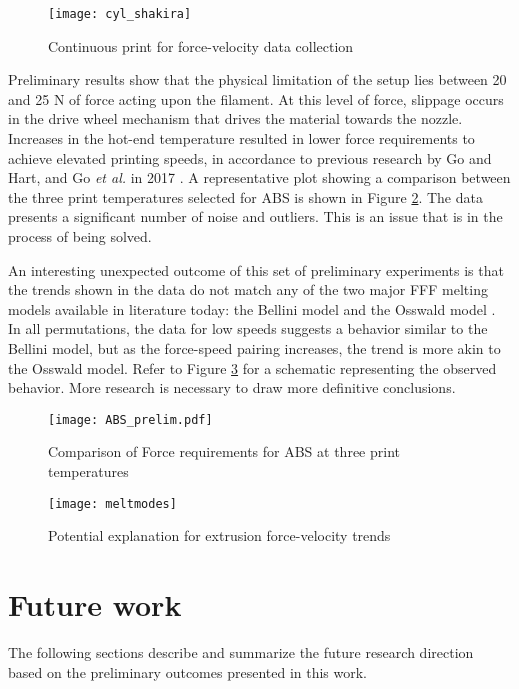 \documentclass[main.tex]{subfiles}
\begin{document}
\begin{figure}[!htbp]
	\center
	\texttt{[image: cyl\_shakira]}
	\caption{Continuous print for force-velocity data collection} \label{fig:cyl}
\end{figure}

Preliminary results show that the physical limitation of the setup lies between 20 and 25 N of force acting upon the filament. At this level of force, slippage occurs in the drive wheel mechanism that drives the material towards the nozzle.  Increases in the hot-end temperature resulted in lower force requirements to achieve elevated printing speeds, in accordance to previous research by Go and Hart, and Go \emph{et al.} in 2017 \cite{Go2017a, Go2017}. A representative plot showing a comparison between the three print temperatures selected for ABS is shown in Figure \ref{fig:absprelim}. The data presents a significant number of noise and outliers. This is an issue that is in the process of being solved.

An interesting unexpected outcome of this set of preliminary experiments is that the trends shown in the data do not match any of the two major FFF melting models available in literature today: the Bellini model and the Osswald model \cite{Bellini2004, OsswaldMelting18}. In all permutations, the data for low speeds suggests a behavior similar to the Bellini model, but as the force-speed pairing increases, the trend is more akin to the Osswald model. Refer to Figure \ref{fig:meltmodes} for a schematic representing the observed behavior. More research is necessary to draw more definitive conclusions.

\begin{figure}[!htbp]
	\center
	\texttt{[image: ABS\_prelim.pdf]}
	\caption{Comparison of Force requirements for ABS at three print temperatures} \label{fig:absprelim}
\end{figure}

\begin{figure}[!htbp]
	\center
	\texttt{[image: meltmodes]}
	\caption{Potential explanation for extrusion force-velocity trends} \label{fig:meltmodes}
\end{figure}

\section{Future work} \label{sec:fw}

The following sections describe and summarize the future research direction based on the preliminary outcomes presented in this work. 
\end{document}
